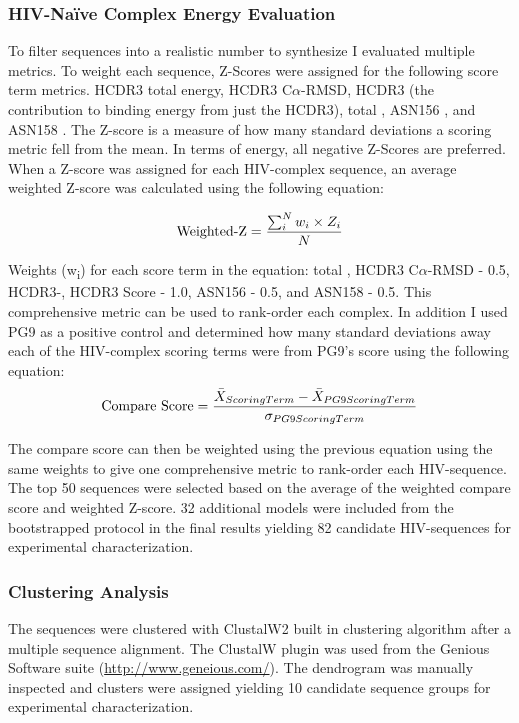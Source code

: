 \subsubsection{HIV-Na\"{i}ve Complex Energy Evaluation}
To filter \naive sequences into a realistic number to synthesize I evaluated multiple metrics. To weight each sequence, Z-Scores were assigned for the following score term metrics. HCDR3 total energy, HCDR3 C$\alpha$-RMSD, HCDR3 \ddg (the contribution to binding energy from just the HCDR3), total \ddg, ASN156 \ddg, and ASN158 \ddg. The Z-score is a measure of how many standard deviations a scoring metric fell from the mean. In terms of energy, all negative Z-Scores are preferred. When a Z-score was assigned for each HIV-\naive complex sequence, an average weighted Z-score was calculated using the following equation:

\begin{gather*}
\textup{Weighted-Z} = \frac{\sum_{i}^{N}w_{i}\times Z_{i}}{N}
\end{gather*}

Weights (w\textsubscript{i}) for each score term in the equation: total , HCDR3 C$\alpha$-RMSD - 0.5, HCDR3-, HCDR3 Score - 1.0, ASN156 \ddg - 0.5, and ASN158 \ddg - 0.5. This comprehensive metric can be used to rank-order each complex. In addition I used PG9 as a positive control and determined how many standard deviations away each of the HIV-\naive complex scoring terms were from PG9's score using the following equation:
\begin{gather*}
\textup{Compare Score} = \frac{\bar{X}_{Scoring Term}-\bar{X}_{PG9 Scoring Term}}{\sigma_{PG9 Scoring Term}}
\end{gather*}

The compare score can then be weighted using the previous equation using the same weights to give one comprehensive metric to rank-order each HIV-\naive sequence. The top 50 sequences were selected based on the average of the weighted compare score and weighted Z-score. 32 additional models were included from the bootstrapped protocol in the final results yielding 82 candidate HIV-\naive sequences for experimental characterization.

\subsubsection{Clustering Analysis}
The sequences were clustered with ClustalW2 built in clustering algorithm after a multiple sequence alignment. The ClustalW plugin was used from the Genious Software suite (\url{http://www.geneious.com/}). The dendrogram was manually inspected and clusters were assigned yielding 10 candidate sequence groups for experimental characterization.

